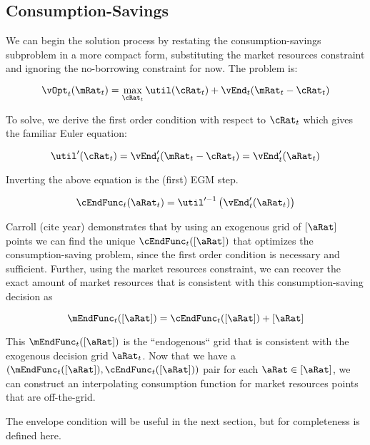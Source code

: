 \documentclass[\econtexRoot/SequentialEGM]{subfiles}
\begin{document}
\subsection{Consumption-Savings}

We can begin the solution process by restating the consumption-savings subproblem in a more compact form, substituting the market resources constraint and ignoring the no-borrowing constraint for now. The problem is:

\begin{equation}
        \vOpt_{t}(\mRat_{t}) = \max_{\cRat_{t}} \util(\cRat_{t}) +
        \vEnd_{t}(\mRat_{t}-\cRat_{t})
\end{equation}

To solve, we derive the first order condition with respect to $\cRat_{t}$ which gives the familiar Euler equation:

\begin{equation}
        \util'(\cRat_t) = \vEnd_{t}'(\mRat_{t} - \cRat_{t}) =
        \vEnd_{t}'(\aRat_{t})
\end{equation}

Inverting the above equation is the (first) EGM step.

\begin{equation}
        \cEndFunc_{t}(\aRat_{t}) = \util'^{-1}\left( \vEnd_{t}'(\aRat_{t})
        \right)
\end{equation}

Carroll (cite year) demonstrates that by using an exogenous grid of $[\aRat]$ points we can find the unique
$\cEndFunc_{t}([\aRat])$ that optimizes the consumption-saving problem, since the first order condition is necessary and sufficient.
Further, using the market resources constraint, we can recover the exact amount
of market resources that is consistent with this consumption-saving decision as


\begin{equation}
        \mEndFunc_{t}([\aRat]) = \cEndFunc_{t}([\aRat]) + [\aRat]
\end{equation}

This $\mEndFunc_{t}([\aRat])$ is the ``endogenous`` grid that is consistent
with the exogenous decision grid $\aRat_{t}$. Now that we have a
$(\mEndFunc_{t}([\aRat]), \cEndFunc_{t}([\aRat]))$ pair for each
$\aRat \in [\aRat]$, we can construct an interpolating consumption function for
market resources points that are off-the-grid.

The envelope condition will be useful in the next section, but for completeness
is defined here.
\end{document}
